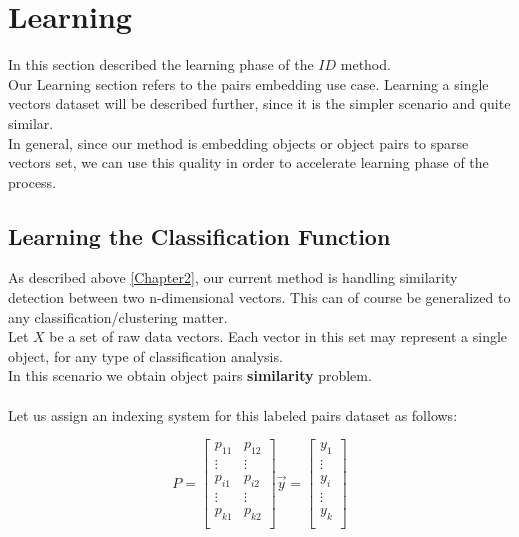 
\chapter{Learning} %

\label{Chapter5} %


In this section described the learning phase of the $ID$ method.\\
Our Learning section refers to the pairs embedding use case. 
Learning a single vectors dataset will be described further, since it is the simpler scenario and quite similar.\\
In general, since our method is embedding objects or object pairs to sparse vectors set, we can use this quality in order to accelerate learning phase of the process.


\section{Learning the Classification Function}

As described above \ref{Chapter2}, our current method is handling similarity detection between two n-dimensional vectors. This can of course be generalized to any classification/clustering matter.
\\
Let $X$ be a set of raw data vectors. Each vector in this set may represent a single object, for any type of classification analysis. 
\\
In this scenario we obtain object pairs \textbf{similarity} problem.
\\ \\Let us assign an indexing system for this labeled pairs dataset as follows:

\begin{equation}
P = \begin{bmatrix}
p_{11} & p_{12}\\ 
 \vdots & \vdots \\ 
p_{i1} & p_{i2}\\ 
 \vdots & \vdots \\ 
p_{k1} & p_{k2}\\ 
\end{bmatrix}
\overrightarrow{y} = \begin{bmatrix}
y_{1} \\ 
 \vdots  \\ 
y_{i} \\ 
 \vdots  \\ 
y_{k} \\ 
\end{bmatrix}
\end{equation}

